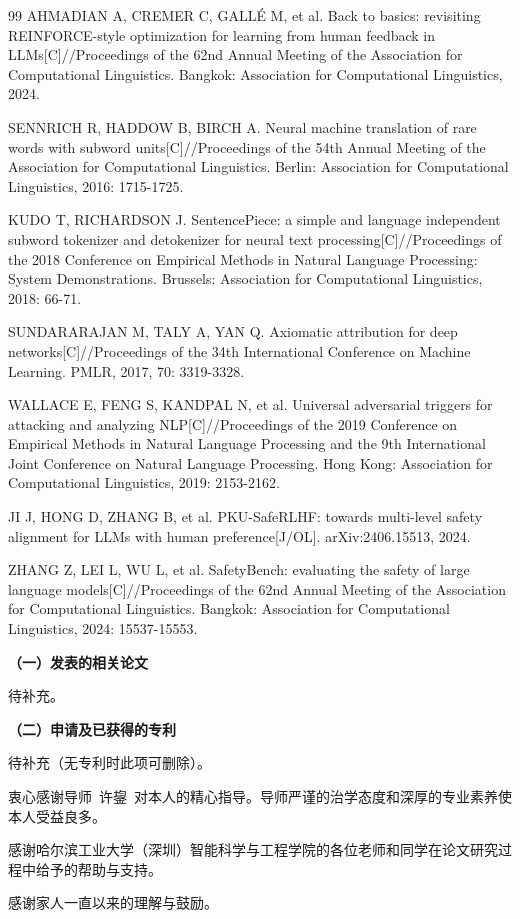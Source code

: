 \documentclass[fontset=fandol,type=master,campus=shenzhen,etitleauto=true]{hithesisbook}
\begin{document}
\begin{thebibliography}{99}
 AHMADIAN A, CREMER C, GALL\'E M, et al. Back to basics: revisiting REINFORCE-style optimization for learning from human feedback in LLMs[C]//Proceedings of the 62nd Annual Meeting of the Association for Computational Linguistics. Bangkok: Association for Computational Linguistics, 2024.

 SENNRICH R, HADDOW B, BIRCH A. Neural machine translation of rare words with subword units[C]//Proceedings of the 54th Annual Meeting of the Association for Computational Linguistics. Berlin: Association for Computational Linguistics, 2016: 1715-1725.

 KUDO T, RICHARDSON J. SentencePiece: a simple and language independent subword tokenizer and detokenizer for neural text processing[C]//Proceedings of the 2018 Conference on Empirical Methods in Natural Language Processing: System Demonstrations. Brussels: Association for Computational Linguistics, 2018: 66-71.

 SUNDARARAJAN M, TALY A, YAN Q. Axiomatic attribution for deep networks[C]//Proceedings of the 34th International Conference on Machine Learning. PMLR, 2017, 70: 3319-3328.

 WALLACE E, FENG S, KANDPAL N, et al. Universal adversarial triggers for attacking and analyzing NLP[C]//Proceedings of the 2019 Conference on Empirical Methods in Natural Language Processing and the 9th International Joint Conference on Natural Language Processing. Hong Kong: Association for Computational Linguistics, 2019: 2153-2162.

 JI J, HONG D, ZHANG B, et al. PKU-SafeRLHF: towards multi-level safety alignment for LLMs with human preference[J/OL]. arXiv:2406.15513, 2024.

 ZHANG Z, LEI L, WU L, et al. SafetyBench: evaluating the safety of large language models[C]//Proceedings of the 62nd Annual Meeting of the Association for Computational Linguistics. Bangkok: Association for Computational Linguistics, 2024: 15537-15553.

\end{thebibliography}

\begin{publication}
\noindent\textbf{（一）发表的相关论文}
\begin{publist}
\item 待补充。
\end{publist}

\noindent\textbf{（二）申请及已获得的专利}
\begin{publist}
\item 待补充（无专利时此项可删除）。
\end{publist}
\end{publication}

\authorization

\begin{acknowledgements}
衷心感谢导师~许鋆~对本人的精心指导。导师严谨的治学态度和深厚的专业素养使本人受益良多。

感谢哈尔滨工业大学（深圳）智能科学与工程学院的各位老师和同学在论文研究过程中给予的帮助与支持。

感谢家人一直以来的理解与鼓励。
\end{acknowledgements}
\end{document}
